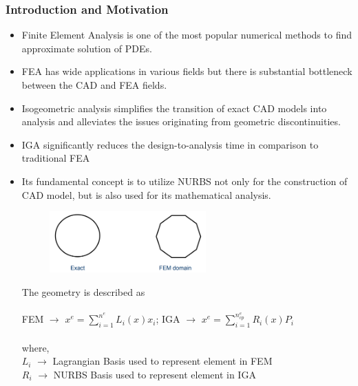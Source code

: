 \documentclass{beamer}
\begin{document}
\begin{frame}[allowframebreaks] \frametitle{Introduction and Motivation}

  \begin{itemize}

  \item Finite Element Analysis is one of the most popular numerical methods to find approximate solution of PDEs.

  \item FEA has wide applications in various fields but there is substantial bottleneck between the CAD and FEA fields.
  
  \item Isogeometric analysis simplifies the transition of exact CAD models into analysis and alleviates the issues originating from geometric discontinuities.
  
  \item IGA significantly reduces the design-to-analysis time in comparison to traditional FEA
  
  \item Its fundamental concept is to utilize NURBS not only for the construction of CAD model, but is also used for its mathematical analysis.

\newpage
\begin{figure}
    \begin{center}
    \includegraphics[width=6cm]{figures/exact_vs_fem.PNG}
    \end{center}
    \label{geometry_exact_fem}
\end{figure}
The geometry is described as\\~\\
FEM $\rightarrow$ $x^e=\sum_{i=1}^{n^e}L_i(x)x_i$; \; \; \; \; IGA $\rightarrow$ $x^e=\sum_{i=1}^{n^e_{cp}}R_i(x)P_i$ \\~\\
where, \\
$L_i$ $\rightarrow$ Lagrangian Basis used to represent element in FEM \\
$R_i$ $\rightarrow$ NURBS Basis used to represent element in IGA


\end{itemize}
\end{frame}
\end{document}
